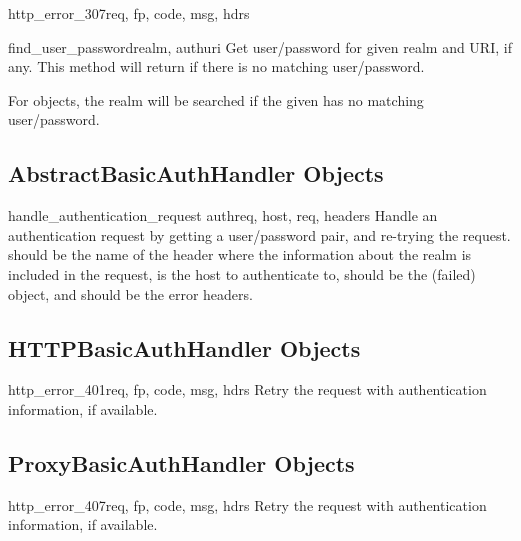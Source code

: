 \begin{methoddesc}[HTTPRedirectHandler]{http_error_307}{req,
                                                  fp, code, msg, hdrs}
\begin{methoddesc}[HTTPPasswordMgr]{find_user_password}{realm, authuri}
Get user/password for given realm and URI, if any.  This method will
return  if there is no matching user/password.

For  objects, the realm
 will be searched if the given  has no matching
user/password.
\end{methoddesc}


\subsection{AbstractBasicAuthHandler Objects
            \label{abstract-basic-auth-handler}}

\begin{methoddesc}[AbstractBasicAuthHandler]{handle_authentication_request}
                                            {authreq, host, req, headers}
Handle an authentication request by getting a user/password pair, and
re-trying the request.   should be the name of the header
where the information about the realm is included in the request,
 is the host to authenticate to,  should be the
(failed)  object, and  should be the error
headers.
\end{methoddesc}


\subsection{HTTPBasicAuthHandler Objects
            \label{http-basic-auth-handler}}

\begin{methoddesc}[HTTPBasicAuthHandler]{http_error_401}{req, fp, code, 
                                                        msg, hdrs}
Retry the request with authentication information, if available.
\end{methoddesc}


\subsection{ProxyBasicAuthHandler Objects
            \label{proxy-basic-auth-handler}}

\begin{methoddesc}[ProxyBasicAuthHandler]{http_error_407}{req, fp, code, 
                                                        msg, hdrs}
Retry the request with authentication information, if available.
\end{methoddesc}



\end{methoddesc}
